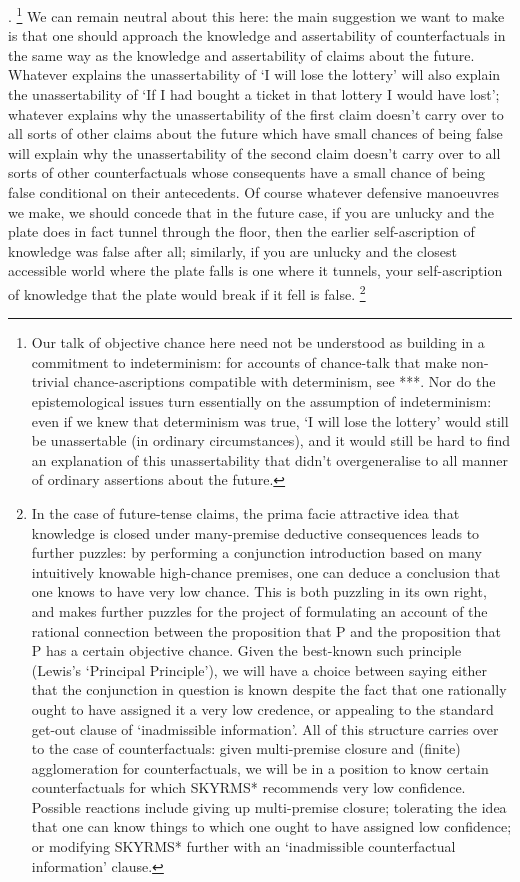 \documentclass[leqno, 11pt, a5paper, openany]{article}
\begin{document}
\cite{HawthorneKL}.%
\footnote{Our talk of objective chance here need not be understood as building in a commitment to indeterminism: for accounts of chance-talk that make non-trivial chance-ascriptions compatible with determinism, see ***. Nor do the epistemological issues turn essentially on the assumption of indeterminism: even if we knew that determinism was true, ‘I will lose the lottery’ would still be unassertable (in ordinary circumstances), and it would still be hard to find an explanation of this unassertability that didn't overgeneralise to all manner of ordinary assertions about the future.} 
We can remain neutral about this here: the main suggestion we want to make is that one should approach the knowledge and assertability of counterfactuals in the same way as the knowledge and assertability of claims about the future. Whatever explains the unassertability of ‘I will lose the lottery’ will also explain the unassertability of ‘If I had bought a ticket in that lottery I would have lost’; whatever explains why the unassertability of the first claim doesn't carry over to all sorts of other claims about the future which have small chances of being false will explain why the unassertability of the second claim doesn't carry over to all sorts of other counterfactuals whose consequents have a small chance of being false conditional on their antecedents. Of course whatever defensive manoeuvres we make, we should concede that in the future case, if you are unlucky and the plate does in fact tunnel through the floor, then the earlier self-ascription of knowledge was false after all; similarly, if you are unlucky and the closest accessible world where the plate falls is one where it tunnels, your self-ascription of knowledge that the plate would break if it fell is false.%
\footnote{In the case of future-tense claims, the prima facie attractive idea that knowledge is closed under many-premise deductive consequences leads to further puzzles: by performing a conjunction introduction based on many intuitively knowable high-chance premises, one can deduce a conclusion that one knows to have very low chance. This is both puzzling in its own right, and makes further puzzles for the project of formulating an account of the rational connection between the proposition that P and the proposition that P has a certain objective chance. Given the best-known such principle (Lewis's ‘Principal Principle’), we will have a choice between saying either that the conjunction in question is known despite the fact that one rationally ought to have assigned it a very low credence, or appealing to the standard get-out clause of ‘inadmissible information’. All of this structure carries over to the case of counterfactuals: given multi-premise closure and (finite) agglomeration for counterfactuals, we will be in a position to know certain counterfactuals for which SKYRMS* recommends very low confidence. Possible reactions include giving up multi-premise closure; tolerating the idea that one can know things to which one ought to have assigned low confidence; or modifying SKYRMS* further with an ‘inadmissible counterfactual information’ clause.}
\end{document}
